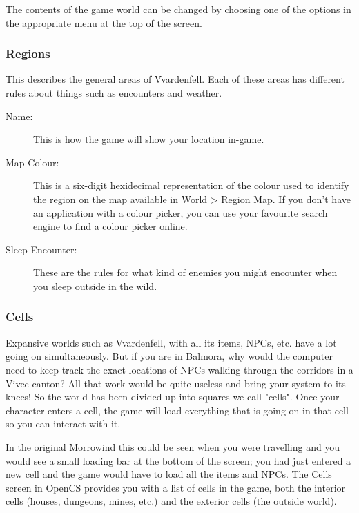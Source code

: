 The contents of the game world can be changed by choosing one of the options in the appropriate menu at the top of the screen.

\subsubsection{Regions}

This describes the general areas of Vvardenfell. Each of these areas has different rules about things such as encounters and weather.

\begin{description}
 \item[Name:] This is how the game will show your location in-game.
 \item[Map Colour:] This is a six-digit hexidecimal representation of the colour used to identify the region on the map available in World > Region Map. If you don't have an application with a colour picker, you can use your favourite search engine to find a colour picker online.
 \item[Sleep Encounter:] These are the rules for what kind of enemies you might encounter when you sleep outside in the wild.
\end{description}

\subsubsection{Cells}

Expansive worlds such as Vvardenfell, with all its items, NPCs, etc. have a lot going on simultaneously. But if you are in Balmora, why would the computer need to keep track the exact locations of NPCs walking through the corridors in a Vivec canton? All that work would be quite useless and bring your system to its knees! So the world has been divided up into squares we call "cells". Once your character enters a cell, the game will load everything that is going on in that cell so you can interact with it.

In the original Morrowind this could be seen when you were travelling and you would see a small loading bar at the bottom of the screen; you had just entered a new cell and the game would have to load all the items and NPCs. The Cells screen in OpenCS provides you with a list of cells in the game, both the interior cells (houses, dungeons, mines, etc.) and the exterior cells (the outside world).

